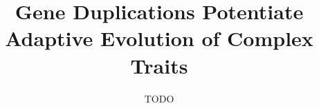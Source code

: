 \title{Gene Duplications Potentiate Adaptive Evolution of Complex Traits}
\author{TODO} %




\maketitle

